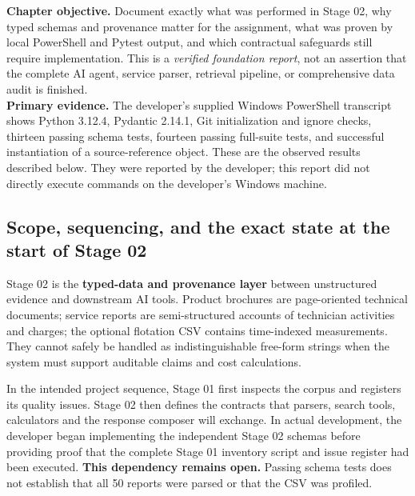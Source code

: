 \documentclass[11pt,a4paper]{article}
\newcommand{\term}[1]{\textbf{#1}}
\begin{document}
\begin{keybox}
\textbf{Chapter objective.} Document exactly what was performed in Stage 02, why typed schemas and provenance matter for the assignment, what was proven by local PowerShell and Pytest output, and which contractual safeguards still require implementation. This is a \emph{verified foundation report}, not an assertion that the complete AI agent, service parser, retrieval pipeline, or comprehensive data audit is finished.\\[3pt]
\textbf{Primary evidence.} The developer's supplied Windows PowerShell transcript shows Python 3.12.4, Pydantic 2.14.1, Git initialization and ignore checks, thirteen passing schema tests, fourteen passing full-suite tests, and successful instantiation of a source-reference object. These are the observed results described below. They were reported by the developer; this report did not directly execute commands on the developer's Windows machine.
\end{keybox}

\subsection{Scope, sequencing, and the exact state at the start of Stage 02}
Stage 02 is the \term{typed-data and provenance layer} between unstructured evidence and downstream AI tools. Product brochures are page-oriented technical documents; service reports are semi-structured accounts of technician activities and charges; the optional flotation CSV contains time-indexed measurements. They cannot safely be handled as indistinguishable free-form strings when the system must support auditable claims and cost calculations.

In the intended project sequence, Stage 01 first inspects the corpus and registers its quality issues. Stage 02 then defines the contracts that parsers, search tools, calculators and the response composer will exchange. In actual development, the developer began implementing the independent Stage 02 schemas before providing proof that the complete Stage 01 inventory script and issue register had been executed. \textbf{This dependency remains open.} Passing schema tests does not establish that all 50 reports were parsed or that the CSV was profiled.
\end{document}
